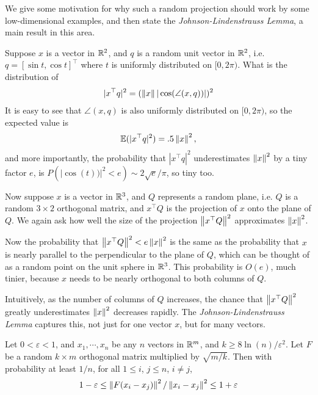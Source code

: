 \documentclass[11pt]{article}
\numberwithin{equation}{section}
\begin{document}
We give some motivation for why such a random projection should work by some low-dimensional examples, and then state the \textit{Johnson-Lindenstrauss Lemma},
a main result in this area.

\begin{example}
    Suppose $x$ is a vector in $\mathbb R^2$, and $q$ is a random unit vector in $\mathbb R^2$, i.e. $q = [\sin t, \cos t]^\top$ where $t$ is uniformly distributed on $[0,2\pi)$. 
    What is the distribution of \begin{align*}
        |x^\top q|^2 = (\left\| x \right\| |\cos(\angle(x,q))|)^2
    \end{align*}
    It is easy to see that $\angle(x,q)$ is also uniformly distributed on $[0,2\pi)$, so the expected value is \begin{align*}
        \mathbb E(|x^\top q|^2) = .5 \left\| x \right\|^2,
    \end{align*} 
    and more importantly, the probability that $|x^\top q|^2$ underestimates $\left\| x \right\|^2$ by a tiny factor $e$, 
    is $P(|\cos(t))|^2 < e) \sim 2\sqrt{e}/\pi$, so tiny too.
\end{example}

\begin{example}
    Now suppose $x$ is a vector in $\mathbb R^3$, and $Q$ represents a random plane, i.e. $Q$ is a random $3\times 2$ orthogonal matrix, 
    and $x^\top Q$ is the projection of $x$ onto the plane of $Q$. We again ask how well the size of the projection $\left\| x^\top Q \right\|^2$ approximates $\left\| x \right\|^2$.

    Now the probability that $\left\| x^\top Q \right\|^2<e\left\| x \right\|^2$ is the same as the probability that $x$ is nearly parallel to the perpendicular to the plane of $Q$, 
    which can be thought of as a random point on the unit sphere in $\mathbb R^3$. This probability is $O(e)$, much tinier, 
    because $x$ needs to be nearly orthogonal to both columns of $Q$.

    Intuitively, as the number of columns of $Q$ increases, the chance that $\left\| x^\top Q \right\|^2$ greatly underestimates $\left\| x \right\|^2$ decreases rapidly. 
    The \textit{Johnson-Lindenstrauss Lemma} captures this, not just for one vector $x$, but for many vectors.
\end{example}

\begin{lemma}
    Let $0< \varepsilon < 1$, and $x_1,\cdots, x_n$ be any $n$ vectors in $\mathbb R^m$, and $k \geq 8\ln(n)/\varepsilon^2$.
    Let $F$ be a random $k \times m$ orthogonal matrix multiplied by $\sqrt{m/k}$. Then with probability at least $1/n$, for all $1 \leq i$, $j \leq n$, $i \neq j$,
    \begin{align*}
        1 - \varepsilon \leq \left\| F(x_i - x_j) \right\|^2/\left\| x_i - x_j \right\|^2 \leq 1 + \varepsilon
    \end{align*}
\end{lemma}
\end{document}
